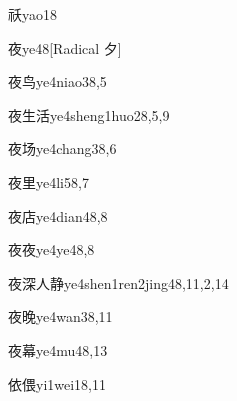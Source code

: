 \begin{verbete}{祅}{yao1}{8}
\end{verbete}

\begin{verbete}{夜}{ye4}{8}[Radical 夕]
\end{verbete}

\begin{verbete}{夜鸟}{ye4niao3}{8,5}
\end{verbete}

\begin{verbete}{夜生活}{ye4sheng1huo2}{8,5,9}
\end{verbete}

\begin{verbete}{夜场}{ye4chang3}{8,6}
\end{verbete}

\begin{verbete}{夜里}{ye4li5}{8,7}
\end{verbete}

\begin{verbete}{夜店}{ye4dian4}{8,8}
\end{verbete}

\begin{verbete}{夜夜}{ye4ye4}{8,8}
\end{verbete}

\begin{verbete}{夜深人静}{ye4shen1ren2jing4}{8,11,2,14}
\end{verbete}

\begin{verbete}{夜晚}{ye4wan3}{8,11}
\end{verbete}

\begin{verbete}{夜幕}{ye4mu4}{8,13}
\end{verbete}

\begin{verbete}{依偎}{yi1wei1}{8,11}
\end{verbete}

